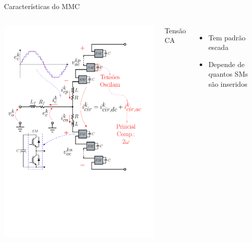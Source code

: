 





\begin{frame}{Características do MMC}


\begin{columns}
\centering
\includegraphics[width=0.9\linewidth]{./figuras/figuras_MMC/MMC_blk_graph3}



Tensão CA
\begin{itemize}
	\item Tem padrão escada\\[5pt]
	\item Depende de quantos SMs são inseridos\\[20pt]
\end{itemize}


\end{columns}
\end{frame}
